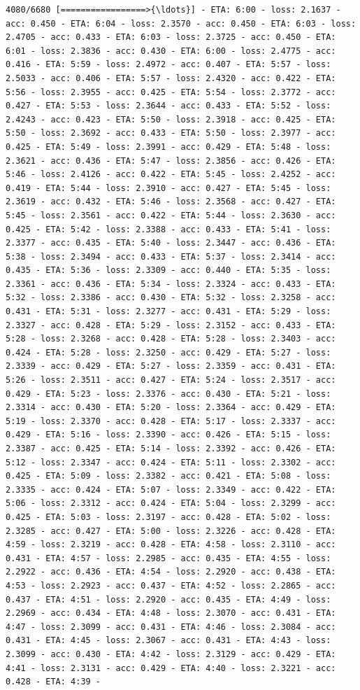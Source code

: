\documentclass[11pt]{article}
\begin{document}
\begin{Verbatim}[commandchars=\\\{\}]
4080/6680 [=================>{\ldots}] - ETA: 6:00 - loss: 2.1637 - acc: 0.450 - ETA: 6:04 - loss: 2.3570 - acc: 0.450 - ETA: 6:03 - loss: 2.4705 - acc: 0.433 - ETA: 6:03 - loss: 2.3725 - acc: 0.450 - ETA: 6:01 - loss: 2.3836 - acc: 0.430 - ETA: 6:00 - loss: 2.4775 - acc: 0.416 - ETA: 5:59 - loss: 2.4972 - acc: 0.407 - ETA: 5:57 - loss: 2.5033 - acc: 0.406 - ETA: 5:57 - loss: 2.4320 - acc: 0.422 - ETA: 5:56 - loss: 2.3955 - acc: 0.425 - ETA: 5:54 - loss: 2.3772 - acc: 0.427 - ETA: 5:53 - loss: 2.3644 - acc: 0.433 - ETA: 5:52 - loss: 2.4243 - acc: 0.423 - ETA: 5:50 - loss: 2.3918 - acc: 0.425 - ETA: 5:50 - loss: 2.3692 - acc: 0.433 - ETA: 5:50 - loss: 2.3977 - acc: 0.425 - ETA: 5:49 - loss: 2.3991 - acc: 0.429 - ETA: 5:48 - loss: 2.3621 - acc: 0.436 - ETA: 5:47 - loss: 2.3856 - acc: 0.426 - ETA: 5:46 - loss: 2.4126 - acc: 0.422 - ETA: 5:45 - loss: 2.4252 - acc: 0.419 - ETA: 5:44 - loss: 2.3910 - acc: 0.427 - ETA: 5:45 - loss: 2.3619 - acc: 0.432 - ETA: 5:46 - loss: 2.3568 - acc: 0.427 - ETA: 5:45 - loss: 2.3561 - acc: 0.422 - ETA: 5:44 - loss: 2.3630 - acc: 0.425 - ETA: 5:42 - loss: 2.3388 - acc: 0.433 - ETA: 5:41 - loss: 2.3377 - acc: 0.435 - ETA: 5:40 - loss: 2.3447 - acc: 0.436 - ETA: 5:38 - loss: 2.3494 - acc: 0.433 - ETA: 5:37 - loss: 2.3414 - acc: 0.435 - ETA: 5:36 - loss: 2.3309 - acc: 0.440 - ETA: 5:35 - loss: 2.3361 - acc: 0.436 - ETA: 5:34 - loss: 2.3324 - acc: 0.433 - ETA: 5:32 - loss: 2.3386 - acc: 0.430 - ETA: 5:32 - loss: 2.3258 - acc: 0.431 - ETA: 5:31 - loss: 2.3277 - acc: 0.431 - ETA: 5:29 - loss: 2.3327 - acc: 0.428 - ETA: 5:29 - loss: 2.3152 - acc: 0.433 - ETA: 5:28 - loss: 2.3268 - acc: 0.428 - ETA: 5:28 - loss: 2.3403 - acc: 0.424 - ETA: 5:28 - loss: 2.3250 - acc: 0.429 - ETA: 5:27 - loss: 2.3339 - acc: 0.429 - ETA: 5:27 - loss: 2.3359 - acc: 0.431 - ETA: 5:26 - loss: 2.3511 - acc: 0.427 - ETA: 5:24 - loss: 2.3517 - acc: 0.429 - ETA: 5:23 - loss: 2.3376 - acc: 0.430 - ETA: 5:21 - loss: 2.3314 - acc: 0.430 - ETA: 5:20 - loss: 2.3364 - acc: 0.429 - ETA: 5:19 - loss: 2.3370 - acc: 0.428 - ETA: 5:17 - loss: 2.3337 - acc: 0.429 - ETA: 5:16 - loss: 2.3390 - acc: 0.426 - ETA: 5:15 - loss: 2.3387 - acc: 0.425 - ETA: 5:14 - loss: 2.3392 - acc: 0.426 - ETA: 5:12 - loss: 2.3347 - acc: 0.424 - ETA: 5:11 - loss: 2.3302 - acc: 0.425 - ETA: 5:09 - loss: 2.3382 - acc: 0.421 - ETA: 5:08 - loss: 2.3335 - acc: 0.424 - ETA: 5:07 - loss: 2.3349 - acc: 0.422 - ETA: 5:06 - loss: 2.3312 - acc: 0.424 - ETA: 5:04 - loss: 2.3299 - acc: 0.425 - ETA: 5:03 - loss: 2.3197 - acc: 0.428 - ETA: 5:02 - loss: 2.3285 - acc: 0.427 - ETA: 5:00 - loss: 2.3226 - acc: 0.428 - ETA: 4:59 - loss: 2.3219 - acc: 0.428 - ETA: 4:58 - loss: 2.3110 - acc: 0.431 - ETA: 4:57 - loss: 2.2985 - acc: 0.435 - ETA: 4:55 - loss: 2.2922 - acc: 0.436 - ETA: 4:54 - loss: 2.2920 - acc: 0.438 - ETA: 4:53 - loss: 2.2923 - acc: 0.437 - ETA: 4:52 - loss: 2.2865 - acc: 0.437 - ETA: 4:51 - loss: 2.2920 - acc: 0.435 - ETA: 4:49 - loss: 2.2969 - acc: 0.434 - ETA: 4:48 - loss: 2.3070 - acc: 0.431 - ETA: 4:47 - loss: 2.3099 - acc: 0.431 - ETA: 4:46 - loss: 2.3084 - acc: 0.431 - ETA: 4:45 - loss: 2.3067 - acc: 0.431 - ETA: 4:43 - loss: 2.3099 - acc: 0.430 - ETA: 4:42 - loss: 2.3129 - acc: 0.429 - ETA: 4:41 - loss: 2.3131 - acc: 0.429 - ETA: 4:40 - loss: 2.3221 - acc: 0.428 - ETA: 4:39 - 
\end{Verbatim}
\end{document}
